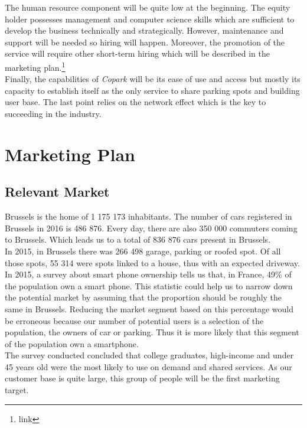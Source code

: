 \documentclass[12pt,a4paper,oneside]{book}
\newcommand{\bp}{\textit{Copark }}
\begin{document}
The human resource component will be quite low at the beginning. The equity holder possesses management and computer science skills which are sufficient to develop the business technically and strategically. However, maintenance and support will be needed so hiring will happen. Moreover, the promotion of the service will require other short-term hiring which will be described in the marketing plan.\footnote{link}\\

Finally, the capabilities of \bp will be its ease of use and access but mostly its capacity to establish itself as the only service to share parking spots and building user base. The last point relies on the network effect which is the key to succeeding in the industry.

\chapter{Marketing Plan}

\section{Relevant Market}
\label{rmar}
Brussels is the home of 1 175 173\cite{ciafb} inhabitants. The number of cars registered in Brussels in 2016 is 486 876.\cite{mtvr} Every day, there are also 350 000 commuters coming to Brussels.\cite{bxcommu} Which leads us to a total of 836 876 cars present in Brussels.\\
In 2015, in Brussels there was 266 498 garage, parking or roofed spot. Of all those spots, 55 314 were spots linked to a house, thus with an expected driveway.\cite{atpb}\\

In 2015, a survey about smart phone ownership tells us that, in France, 49\% of the population own a smart phone.\cite{spown} This statistic could help us to narrow down the potential market by assuming that the proportion should be roughly the same in Brussels. Reducing the market segment based on this percentage would be erroneous because our number of potential users is a selection of the population, the owners of car or parking. Thus it is more likely that this segment of the population own a smartphone.\\

The survey conducted concluded that college graduates, high-income and under 45 years old were the most likely to use on demand and shared services.\cite{airbnbuse} As our customer base is quite large, this group of people will be the first marketing target.
\end{document}
